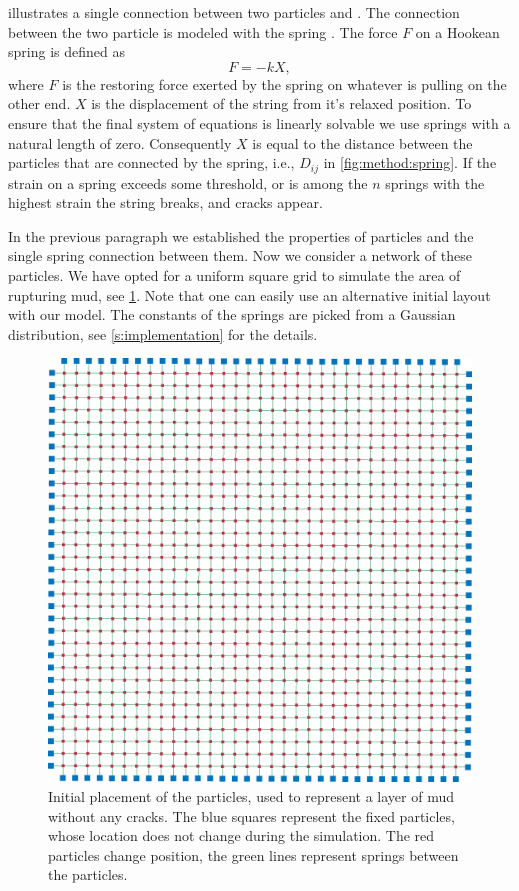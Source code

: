  illustrates a single connection between two particles  and . The connection between the two particle is modeled with the spring . The force $F$ on a Hookean spring is defined as
%
\begin{equation}\label{eq:method:hookeslaw}
	F = -k X,	
\end{equation}
%
where $F$ is the restoring force exerted by the spring on whatever is pulling on the other end. $X$ is the displacement of the string from it's relaxed position. To ensure that the final system of equations is linearly solvable we use springs with a natural length of zero. Consequently $X$ is equal to the distance between the particles that are connected by the spring, i.e., $D_{ij}$ in \cref{fig:method:spring}. If the strain on a spring exceeds some threshold, or is among the $n$ springs with the highest strain the string breaks, and cracks appear.

In the previous paragraph we established the properties of particles and the single spring connection between them. Now we consider a network of these particles. We have opted for a uniform square grid to simulate the area of rupturing mud, see \cref{fig:model:layout}. Note that one can easily use an alternative initial layout with our model. The constants of the springs are picked from a Gaussian distribution, see \cref{s:implementation} for the details.
%
\begin{figure}
	\centering
	\includegraphics[width=0.9\columnwidth]{img/uniform_square_grid.png}
	\caption{Initial placement of the particles, used to represent a layer of mud without any cracks. The blue squares represent the fixed particles, whose location does not change during the simulation. The red particles change position, the green lines represent springs between the particles.}
	\label{fig:model:layout}
\end{figure}

